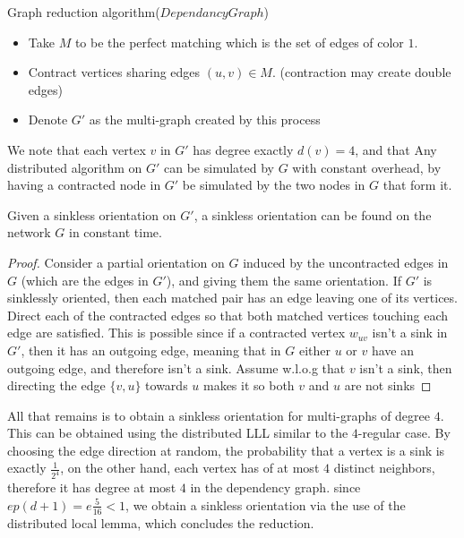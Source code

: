 \begin{algorithm}[H]\label{Graph reduction algorithm_colored}\small
	\caption{\small Graph reduction algorithm($DependancyGraph$)}
	\begin{itemize}
		\item Take $M$ to be the perfect matching which is the set of edges of color $1$.
		\item Contract vertices sharing edges $(u,v) \in M$. (contraction may create double edges)
		\item Denote $G'$ as the multi-graph  created by this process
	\end{itemize}
\end{algorithm}

We note that each vertex $v$ in $G'$ has degree exactly $d(v)=4$, and that Any distributed algorithm on $G'$ can be simulated by $G$ with constant overhead, by having a contracted node in $G'$ be simulated by the two nodes in $G$ that form it.  

\begin{lemma}
	Given a sinkless orientation on $G'$, a sinkless orientation can be found on the network $G$ in constant time.
\end{lemma}
\begin{proof}
	Consider a partial orientation on $G$ induced by  the uncontracted edges in $G$ (which are the edges in $G'$), and giving them the same orientation. If $G'$ is sinklessly oriented, then each matched pair has an edge leaving one of its vertices. Direct each of the contracted edges so that both matched vertices touching each edge are satisfied. This is possible since if a contracted vertex $w_{uv}$ isn't a sink in $G'$, then it has an outgoing edge, meaning that in $G$ either $u$ or $v$ have an outgoing edge, and therefore isn't a sink. Assume w.l.o.g that $v$ isn't a sink, then directing the edge $\{v,u\}$ towards $u$ makes it so both $v$ and $u$ are not sinks
\end{proof}

All that remains is to obtain a sinkless orientation for multi-graphs of degree $4$. This can be obtained using the distributed LLL similar to the $4$-regular case. By choosing the edge direction at random, the probability that a vertex is a sink is exactly $\frac{1}{2^4}$, on the other hand, each vertex has of at most $4$ distinct neighbors, therefore it has degree at most $4$ in the dependency graph. since $ep(d+1) = e\frac{5}{16} < 1$, we obtain a sinkless orientation via the use of the distributed local lemma, which concludes the reduction.


